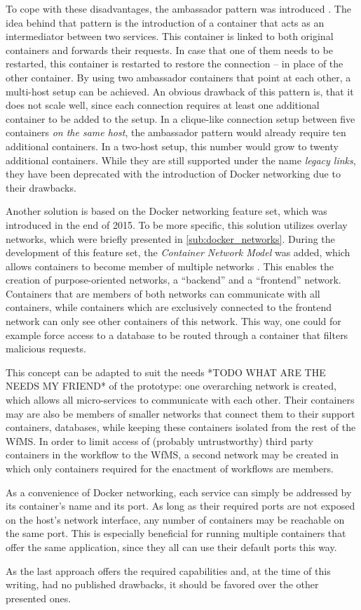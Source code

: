   To cope with these disadvantages, the ambassador pattern was introduced \cite{Docker2016Docker}. The idea behind that pattern is the introduction of a container that acts as an intermediator between two services. This container is linked to both original containers and forwards their requests. In case that one of them needs to be restarted, this container is restarted to restore the connection -- in place of the other container.
  By using two ambassador containers that point at each other, a multi-host setup can be achieved.
  An obvious drawback of this pattern is, that it does not scale well, since each connection requires at least one additional container to be added to the setup. In a clique-like connection setup between five containers \emph{on the same host}, the ambassador pattern would already require ten additional containers. In a two-host setup, this number would grow to twenty additional containers.
  While they are still supported under the name \emph{legacy links}, they have been deprecated with the introduction of Docker networking due to their drawbacks.

  Another solution is based on the Docker networking feature set, which was introduced in the end of 2015.
  To be more specific, this solution utilizes overlay networks, which were briefly presented in \ref{sub:docker_networks}. During the development of this feature set, the \emph{Container Network Model} was added, which allows containers to become member of multiple networks \cite{Tucker2015Docker}.
  This enables the creation of purpose-oriented networks, \eg a ``backend'' and a ``frontend'' network. Containers that are members of both networks can communicate with all containers, while containers which are exclusively connected to the frontend network can only see other containers of this network. This way, one could for example force access to a database to be routed through a container that filters malicious requests.

  This concept can be adapted to suit the needs *TODO WHAT ARE THE NEEDS MY FRIEND* of the prototype: one overarching network is created, which allows all micro-services to communicate with each other. Their containers may are also be members of smaller networks that connect them to their support containers, \eg databases, while keeping these containers isolated from the rest of the \ac{WfMS}. In order to limit access of (probably untrustworthy) third party containers in the workflow to the \ac{WfMS}, a second network may be created in which only containers required for the enactment of workflows are members.

  As a convenience of Docker networking, each service can simply be addressed by its container's name and its port. As long as their required ports are not exposed on the host's network interface, any number of containers may be reachable on the same port. This is especially beneficial for running multiple containers that offer the same application, since they all can use their default ports this way.

  As the last approach offers the required capabilities and, at the time of this writing, had no published drawbacks, it should be favored over the other presented ones.
